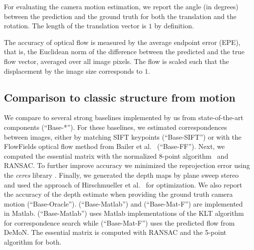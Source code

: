 \documentclass[10pt,twocolumn,letterpaper]{article}
\begin{document}
For evaluating the camera motion estimation, we report the angle (in degrees) between the prediction and the ground truth for both the translation and the rotation. 
The length of the translation vector is $1$ by definition.

The accuracy of optical flow is measured by the average endpoint error (EPE), that is, the Euclidean norm of the difference between the predicted and the true flow vector, averaged over all image pixels. The flow is scaled such that the displacement by the image size corresponds to $1$.


\subsection{Comparison to classic structure from motion}

We compare to several strong baselines implemented by us from state-of-the-art components (``Base-*'').
For these baselines, we estimated correspondences between images, either by matching SIFT keypoints (``Base-SIFT'') or with the FlowFields  optical flow method from Bailer et al.~\cite{bailer_flow_2015} (``Base-FF'').
Next, we computed the essential matrix with the normalized 8-point algorithm~\cite{hartley_defense_1997} and RANSAC.
To further improve accuracy we minimized the reprojection error using the \emph{ceres} library \cite{agarwal_ceres}.
Finally, we generated the depth maps by plane sweep stereo and used the approach of Hirschmueller et al.~\cite{hirschmuller_accurate_2005} for optimization.
We also report the accuracy of the depth estimate when providing the ground truth camera motion (``Base-Oracle'').
(``Base-Matlab'') and (``Base-Mat-F'') are implemented in Matlab. (``Base-Matlab'') uses Matlab implementations of the KLT algorithm \cite{Tomasi91detectionand,lucas_iterative_1981,Shi_1994_3266} for correspondence search while (``Base-Mat-F'') uses the predicted flow from DeMoN. The essential matrix is computed with RANSAC and the 5-point algorithm \cite{nister_efficient_2004} for both.
\end{document}
